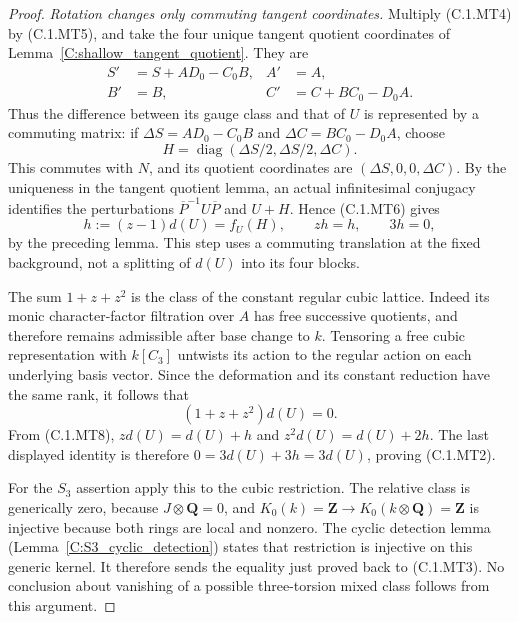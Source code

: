 \begin{proof}
\emph{Rotation changes only commuting tangent coordinates.}
Multiply (C.1.MT4) by (C.1.MT5), and take the four unique
tangent quotient coordinates of
Lemma~\ref{C:shallow_tangent_quotient}.
They are
\[
 \begin{split}
 S'&=S+AD_0-C_0B, & A'&=A,\\
 B'&=B,          & C'&=C+BC_0-D_0A.
 \end{split}                                                   \tag{C.1.MT7}
\]
Thus the difference between its gauge class and that of $U$
is represented by a commuting matrix: if
$\Delta S=AD_0-C_0B$ and $\Delta C=BC_0-D_0A$, choose
\[
 H=\operatorname{diag}(\Delta S/2,\Delta S/2,\Delta C).
\]
This commutes with $N$, and its quotient coordinates are
$(\Delta S,0,0,\Delta C)$.
By the uniqueness in the tangent quotient lemma, an actual
infinitesimal conjugacy identifies the perturbations
$\overline P^{-1}U\overline P$ and $U+H$.
Hence (C.1.MT6) gives
\[
             h:=(z-1)d(U)=f_U(H),\qquad zh=h,
             \qquad 3h=0,                                \tag{C.1.MT8}
\]
by the preceding lemma.
This step uses a commuting translation at the fixed
background, not a splitting of $d(U)$ into its four blocks.

The sum $1+z+z^2$ is the class of the constant regular
cubic lattice.  Indeed its monic character-factor filtration
over $A$ has free successive quotients, and therefore
remains admissible after base change to $k$.
Tensoring a free cubic representation with $k[C_3]$
untwists its action to the regular action on each underlying
basis vector.  Since the deformation and its constant
reduction have the same rank, it follows that
\[
                       (1+z+z^2)d(U)=0.
\]
From (C.1.MT8), $zd(U)=d(U)+h$ and
$z^2d(U)=d(U)+2h$.
The last displayed identity is therefore
$0=3d(U)+3h=3d(U)$, proving (C.1.MT2).

For the $S_3$ assertion apply this to the cubic restriction.
The relative class is generically zero, because
$J\otimes\mathbf Q=0$, and
$K_0(k)=\mathbf Z\to K_0(k\otimes\mathbf Q)=\mathbf Z$
is injective because both rings are local and nonzero.
The cyclic detection lemma
(Lemma~\ref{C:S3_cyclic_detection}) states that restriction
is injective on this generic kernel.
It therefore sends the equality just proved back to
(C.1.MT3).  No conclusion about vanishing of a possible
three-torsion mixed class follows from this argument.
\end{proof}
